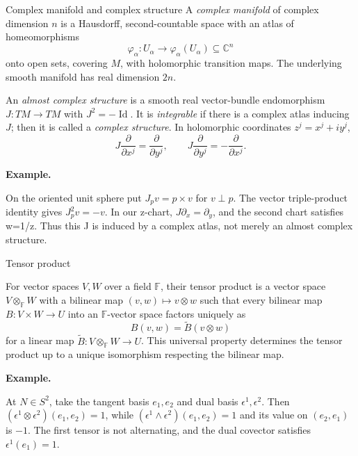 \documentclass[11pt]{article}
\makeatletter
\newcommand{\C}{\mathbb C}
\newcommand{\id}{\operatorname{Id}}
\newcounter{definition}
\newcommand{\exampleheading}{\par\medskip\textbf{Example.}\par\smallskip}
\newcommand{\currentdefinition}[1]{\protected@edef\@currentlabel{#1}}
\makeatother
\begin{document}
\newpage
\begin{definitionbox}{Complex manifold and complex structure}
\currentdefinition{\thedefinition}
\label{source:S12}
\label{def:B04}
A \emph{complex manifold} of complex dimension $n$ is a Hausdorff,
second-countable space with an atlas of homeomorphisms
\[
\varphi_\alpha:U_\alpha\longrightarrow
\varphi_\alpha(U_\alpha)\subseteq\C^n
\]
onto open sets, covering $M$, with holomorphic transition maps.
The underlying smooth manifold has real dimension $2n$.

An \emph{almost complex structure} is a smooth real vector-bundle
endomorphism $J:TM\to TM$ with $J^2=-\id$.
It is \emph{integrable} if there is a complex atlas inducing $J$;
then it is called a \emph{complex structure}.
In holomorphic coordinates $z^j=x^j+iy^j$,
\[
J\frac{\partial}{\partial x^j}=\frac{\partial}{\partial y^j},
\qquad
J\frac{\partial}{\partial y^j}=-\frac{\partial}{\partial x^j}.
\]


\exampleheading
On the oriented unit sphere put $J_pv=p\times v$ for $v\perp p$. The vector triple-product identity gives $J_p^2v=-v$. In our z-chart, $J\partial_x=\partial_y$, and the second chart satisfies w=1/z. Thus this J is induced by a complex atlas, not merely an almost complex structure.
\end{definitionbox}

\begin{definitionbox}{Tensor product}
\currentdefinition{\thedefinition}
\label{source:S13}

For vector spaces $V,W$ over a field $\mathbb F$, their tensor product
is a vector space $V\otimes_{\mathbb F}W$ with a bilinear map
$(v,w)\mapsto v\otimes w$ such that every bilinear map
$B:V\times W\to U$ into an $\mathbb F$-vector space factors uniquely as
\[
B(v,w)=\widetilde B(v\otimes w)
\]
for a linear map $\widetilde B:V\otimes_{\mathbb F}W\to U$.
This universal property determines the tensor product up to a unique
isomorphism respecting the bilinear map.


\exampleheading
At $N\in S^2$, take the tangent basis $e_1,e_2$ and dual basis $\epsilon^1,\epsilon^2$. Then $(\epsilon^1\otimes\epsilon^2)(e_1,e_2)=1$, while $(\epsilon^1\wedge\epsilon^2)(e_1,e_2)=1$ and its value on $(e_2,e_1)$ is $-1$. The first tensor is not alternating, and the dual covector satisfies $\epsilon^1(e_1)=1$.
\end{definitionbox}
\end{document}
